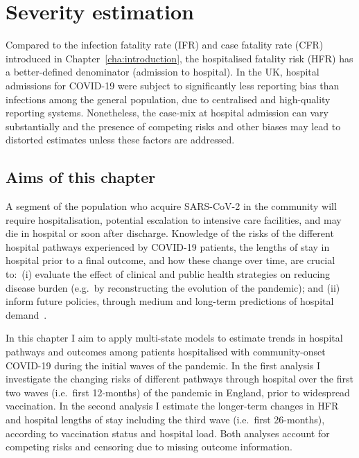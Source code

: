 \chapter{Severity estimation}\label{cha:hospitalseverity}

\graphicspath{{03_HospitalSeverity/Figs/}}

Compared to the infection fatality rate (IFR) and case fatality rate (CFR) introduced in Chapter~\ref{cha:introduction}, the hospitalised fatality risk (HFR) has a better-defined denominator (admission to hospital). In the UK, hospital admissions for COVID-19 were subject to significantly less reporting bias than infections among the general population, due to centralised and high-quality reporting systems. Nonetheless, the case-mix at hospital admission can vary substantially and the presence of competing risks and other biases may lead to distorted estimates unless these factors are addressed.

\section{Aims of this chapter}

A segment of the population who acquire SARS-CoV-2 in the community will require hospitalisation, potential escalation to intensive care facilities, and may die in hospital or soon after discharge. Knowledge of the risks of the different hospital pathways experienced by COVID-19 patients, the lengths of stay in hospital prior to a final outcome, and how these change over time, are crucial to:\ (i) evaluate the effect of clinical and public health strategies on reducing disease burden (e.g.\ by reconstructing the evolution of the pandemic); and (ii) inform future policies, through medium and long-term predictions of hospital demand~\parencite{Birrell2021-pu, Scientific_Pandemic_Influenza_Group_on_Modelling_Operational_sub-group2021-il}.

In this chapter I aim to apply multi-state models to estimate trends in hospital pathways and outcomes among patients hospitalised with community-onset COVID-19 during the initial waves of the pandemic. In the first analysis I investigate the changing risks of different pathways through hospital over the first two waves (i.e.\ first 12-months) of the pandemic in England, prior to widespread vaccination. In the second analysis I estimate the longer-term changes in HFR and hospital lengths of stay including the third wave (i.e.\ first 26-months), according to vaccination status and hospital load. Both analyses account for competing risks and censoring due to missing outcome information.

